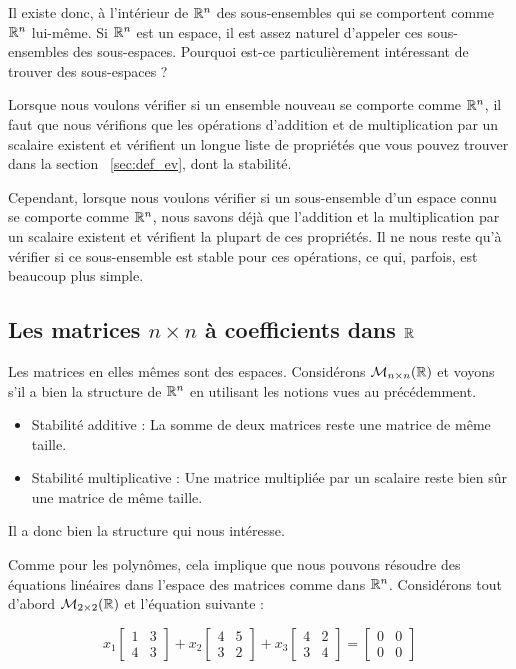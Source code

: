 Il existe donc, à l'intérieur de $\mathbb{R}^n$ des sous-ensembles qui se comportent comme $\mathbb{R}^n$ lui-même. Si $\mathbb{R}^n$ est un espace, il est assez naturel d'appeler ces sous-ensembles des sous-espaces. Pourquoi est-ce particulièrement intéressant de trouver des sous-espaces ?

Lorsque nous voulons vérifier si un ensemble nouveau se comporte comme $\mathbb{R}^n$, il faut que nous vérifions que les opérations d'addition et de multiplication par un scalaire existent et vérifient un longue liste de propriétés que vous pouvez trouver dans la section ~\ref{sec:def_ev}, dont la stabilité.

Cependant, lorsque nous voulons vérifier si un sous-ensemble d'un espace connu se comporte comme $\mathbb{R}^n$, nous savons déjà que l'addition et la multiplication par un scalaire existent et vérifient la plupart de ces propriétés. Il ne nous reste qu'à vérifier si ce sous-ensemble est stable pour ces opérations, ce qui, parfois, est beaucoup plus simple.


\subsection{Les matrices $n \times n$ à coefficients dans $\mathbb{R}$}
Les matrices en elles mêmes sont des espaces. Considérons $\mathcal{M}_{n\times n}(\mathbb{R})$ et voyons s'il a bien la structure de $\mathbb{R}^n$ en utilisant les notions vues au précédemment.

\begin{itemize}
    \item Stabilité additive : La somme de deux matrices reste une matrice de même taille.
    \item Stabilité multiplicative : Une matrice multipliée par un scalaire reste bien sûr une matrice de même taille.
\end{itemize}

Il a donc bien la structure qui nous intéresse.

Comme pour les polynômes, cela implique que nous pouvons résoudre des équations linéaires dans l'espace des matrices comme dans $\mathbb{R}^n$. Considérons tout d'abord $\mathcal{M}_{2 \times 2}(\mathbb{R})$ et l'équation suivante :


\begin{equation} \label{eq:eq_lin_matr}
    x_1\begin{bmatrix}1&3\\4&3\end{bmatrix}+ x_2\begin{bmatrix}4&5\\3&2\end{bmatrix}+x_3\begin{bmatrix}4&2\\3&4\end{bmatrix} = \begin{bmatrix}0&0\\0&0\end{bmatrix}
\end{equation}


